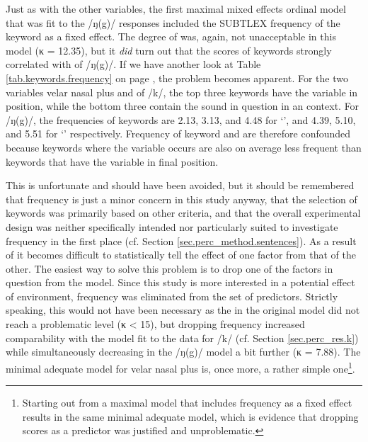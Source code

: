 Just as with the other variables, the first maximal mixed effects ordinal model that was fit to the /ŋ(g)/ responses included the SUBTLEX frequency of the keyword as a fixed effect.
The degree of  was, again, not unacceptable in this model (κ = 12.35), but it \emph{did} turn out that the  scores of keywords strongly correlated with  of /ŋ(g)/.
If we have another look at Table \ref{tab.keywords.frequency} on page \pageref{tab.keywords.frequency}, the problem becomes apparent.
For the two  variables velar nasal plus and  of /k/, the top three keywords have the variable in  position, while the bottom three contain the sound in question in an  context.
For /ŋ(g)/, the frequencies of keywords are 2.13, 3.13, and 4.48 for `', and 4.39, 5.10, and 5.51 for `' respectively.
Frequency of keyword and  are therefore confounded because keywords where the variable occurs  are also on average less frequent than keywords that have the variable in final position.

This is unfortunate and should have been avoided, but it should be remembered that frequency is just a minor concern in this study anyway, that the selection of keywords was primarily based on other criteria, and that the overall experimental design was neither specifically intended nor particularly suited to investigate frequency in the first place (cf. Section \ref{sec.perc_method.sentences}).
As a result of  it becomes difficult to statistically tell the effect of one factor from that of the other.
The easiest way to solve this problem is to drop one of the factors in question from the model.
Since this study is more interested in a potential effect of environment, frequency was eliminated from the set of predictors.
Strictly speaking, this would not have been necessary as the  in the original model did not reach a problematic level (κ < 15), but dropping frequency increased comparability with the model fit to the data for /k/ (cf. Section \ref{sec.perc_res.k}) while simultaneously decreasing  in the /ŋ(g)/ model a bit further (κ = 7.88).
The minimal adequate model for velar nasal plus is, once more, a rather simple one\footnote{Starting out from a maximal model that includes frequency as a fixed effect results in the same minimal adequate model, which is evidence that dropping  scores as a predictor was justified and unproblematic.}.

